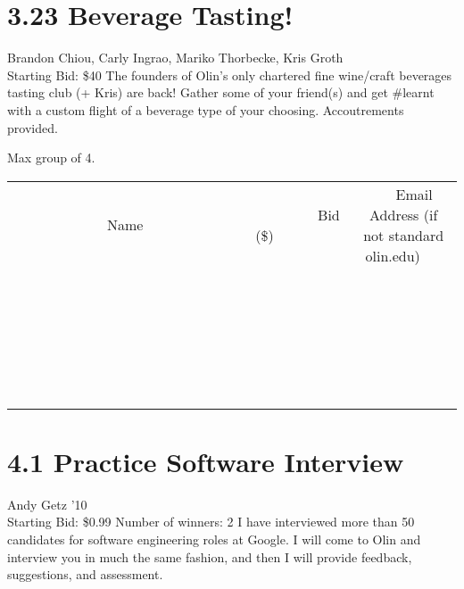 \documentclass[11pt]{article}
\begin{document}
\section*{3.23 Beverage Tasting!}
Brandon Chiou, Carly Ingrao, Mariko Thorbecke, Kris Groth
\\
Starting Bid: \$40
\newline
The founders of Olin's only chartered fine wine/craft beverages tasting club (+ Kris) are back! Gather some of your friend(s) and get \#learnt with a custom flight of a beverage type of your choosing. Accoutrements provided.

Max group of 4.
\\[6ex]
\begin{tabular}{c c c}
~~~~~~~~~~~~~Name~~~~~~~~~~~~~ & ~~~~~~~~~Bid (\$)~~~~~~~~~  & ~~~Email Address (if not standard olin.edu)~~~\\
 & & \\
\hline
 & & \\
\hline
 & & \\
\hline
 & & \\
\hline
 & & \\
\hline
 & & \\
\hline
 & & \\
\hline
 & & \\
\hline
 & & \\
\hline
 & & \\
\hline
 & & \\
\hline
 & & \\
\hline
 & & \\
\hline
 & & \\
\hline
 & & \\
\hline
 & & \\
\hline
 & & \\
\hline
 & & \\
\hline
 & & \\
\hline
 & & \\
\hline
 & & \\
\hline
 & & \\
\hline
 & & \\
\hline
 & & \\
\hline
 & & \\
\hline
 & & \\
\hline
\end{tabular}
\newpage
\section*{4.1 Practice Software Interview}
Andy Getz '10
\\
Starting Bid: \$0.99
\newline
Number of winners: 2
\newline
I have interviewed more than 50 candidates for software engineering roles at Google.  I will come to Olin and interview you in much the same fashion, and then I will provide feedback, suggestions, and assessment.
\end{document}
